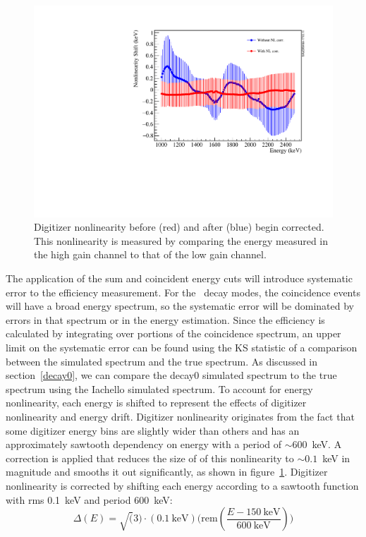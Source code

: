 \documentclass[/main.tex]{subfiles}
\begin{document}
\begin{figure}[h]
  \centering
  \includegraphics[width=0.8\linewidth]{DigitizerNonlinearity}
  \caption[Measured Digitizer Nonlinearity vs Energy]{\label{fig:dignonlin}
    Digitizer nonlinearity before (red) and after (blue) begin corrected. This nonlinearity is measured by comparing the energy measured in the high gain channel to that of the low gain channel.
  }
\end{figure}
The application of the sum and coincident energy cuts will introduce systematic error to the efficiency measurement.
For the \tnbb\ decay modes, the coincidence events will have a broad energy spectrum, so the systematic error will be dominated by errors in that spectrum or in the energy estimation.
Since the efficiency is calculated by integrating over portions of the coincidence spectrum, an upper limit on the systematic error can be found using the KS statistic of a comparison between the simulated spectrum and the true spectrum.
As discussed in section~\ref{decay0}, we can compare the decay0 simulated spectrum to the true spectrum using the Iachello simulated spectrum.
To account for energy nonlinearity, each energy is shifted to represent the effects of digitizer nonlinearity and energy drift.
Digitizer nonlinearity originates from the fact that some digitizer energy bins are slightly wider than others and has an approximately sawtooth dependency on energy with a period of $\sim600$~keV.
A correction is applied that reduces the size of of this nonlinearity to $\sim0.1$~keV in magnitude and smooths it out significantly, as shown in figure~\ref{fig:dignonlin}.
Digitizer nonlinearity is corrected by shifting each energy according to a sawtooth function with rms 0.1~keV and period 600~keV:
\begin{equation}
  \Delta(E) = \sqrt(3)\cdot (0.1~\mathrm{keV}) \big(\mathrm{rem}(\frac{E-150~\mathrm{keV}}{600~\mathrm{keV}}) \big)
\end{equation}
\end{document}
